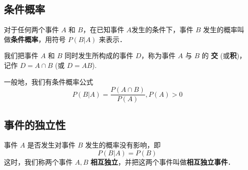
\begin{issues}
\issueDraft
\end{issues}

\subsection{条件概率}
对于任何两个事件 $A$ 和 $B$，在已知事件 $A$发生的条件下，事件 $B$ 发生的概率叫做\textbf{条件概率}，用符号 $P(B|A)$ 来表示．

我们把事件 $A$ 和 $B$ 同时发生所构成的事件 $D$，称为事件 $A$ 与 $B$ 的 \textbf{交} (或\textbf{积})，记作 $D = A \cap B$ (或 $D = AB$).

一般地，我们有条件概率公式
\begin{equation}
P(B|A) = \frac{P(A \cap B)}{P(A)},P(A)>0
\end{equation}

\subsection{事件的独立性}
事件 $A$ 是否发生对事件 $B$ 发生的概率没有影响，即
\begin{equation}
P(B|A) = P(B)
\end{equation}
这时，我们称两个事件 $A,B$ \textbf{相互独立}，并把这两个事件叫做\textbf{相互独立事件}．
